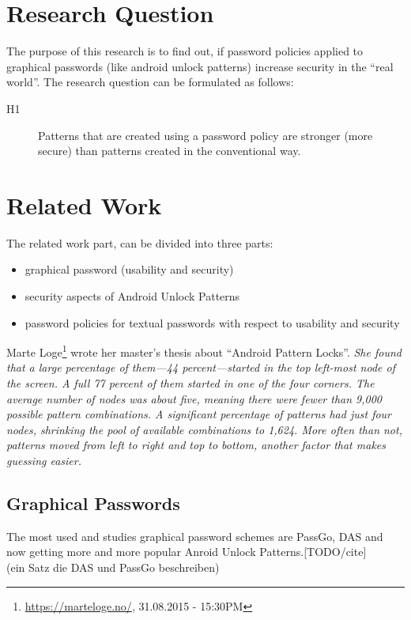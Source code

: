 \documentclass[twocolumn, a4paper, 10pt]{article}
\begin{document}
\section{Research Question}
The purpose of this research is to find out, if password policies applied to graphical passwords (like android unlock patterns) increase security in the ``real world''. The research question can be formulated as follows:\\

\begin{description}
  \item[H1]
  Patterns that are created using a password policy are stronger (more secure) than patterns created in the conventional way.
\end{description}


\section{Related Work}
The related work part, can be divided into three parts:

\begin{itemize}
  \item graphical password (usability and security)
  \item security aspects of Android Unlock Patterns
  \item password policies for textual passwords with respect to usability and security
\end{itemize}

Marte Loge\footnote{\url{https://marteloge.no/}, 31.08.2015 - 15:30PM} wrote her master's thesis about ``Android Pattern Locks''. \emph{She found that a large percentage of them—44 percent—started in the top left-most node of the screen. A full 77 percent of them started in one of the four corners. The average number of nodes was about five, meaning there were fewer than 9,000 possible pattern combinations. A significant percentage of patterns had just four nodes, shrinking the pool of available combinations to 1,624. More often than not, patterns moved from left to right and top to bottom, another factor that makes guessing easier.}

\subsection{Graphical Passwords}

The most used and studies graphical password schemes are PassGo, DAS and now getting more and more popular Anroid Unlock Patterns.[TODO/cite]\\
(ein Satz die DAS und PassGo beschreiben)\\
\end{document}
